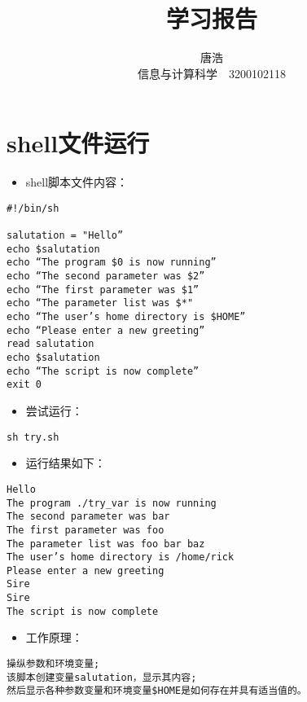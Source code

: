 \documentclass[a4paper,12pt]{ctexart}
\title{学习报告}
\author{唐浩 \\ 信息与计算科学　3200102118}
\begin{document}
\maketitle

\pagestyle{empty}

\section{shell文件运行}

\begin{itemize}
\item shell脚本文件内容：
\end{itemize}

\begin{verbatim}
#!/bin/sh

salutation = "Hello”
echo $salutation
echo “The program $0 is now running”
echo “The second parameter was $2”
echo “The first parameter was $1”
echo “The parameter list was $*"
echo “The user’s home directory is $HOME”
echo “Please enter a new greeting”
read salutation
echo $salutation
echo “The script is now complete”
exit 0
\end{verbatim}

\begin{itemize}
\item 尝试运行：
\end{itemize}

\begin{verbatim}
sh try.sh
\end{verbatim}

\begin{itemize}
\item 运行结果如下：
\end{itemize}

\begin{verbatim}
Hello
The program ./try_var is now running
The second parameter was bar
The first parameter was foo
The parameter list was foo bar baz
The user’s home directory is /home/rick
Please enter a new greeting
Sire
Sire
The script is now complete
\end{verbatim}


\begin{itemize}
\item 工作原理：
\end{itemize}

\begin{verbatim}
操纵参数和环境变量;
该脚本创建变量salutation，显示其内容;
然后显示各种参数变量和环境变量$HOME是如何存在并具有适当值的。
\end{verbatim}
\end{document}
